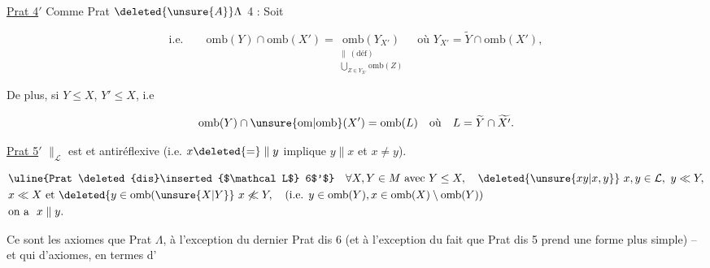 \uline{Prat  4$'$} Comme Prat $\deleted{\unsure{A}}\Lambda$ 4 :  Soit


\[
\text{i.e.}\qquad \mathrm{omb}(Y)\cap\mathrm{omb}(X')=
\underset{\substack{\parallel\,(\mathrm{déf})\\ \displaystyle\bigcup_{Z\in Y_{X'}}\mathrm{omb}(Z)}}{\mathrm{omb}(Y_{X'})}
\quad \text{où }Y_{X'}=\widetilde Y\cap\mathrm{omb}(X'),
\]

De plus, si $Y\leq X$,  $Y'\leq X$, i.e

\[
\mathrm{omb}(Y)\cap\unsure{\mathrm{om}|\mathrm{omb}}(X')=\mathrm{omb}(L)\quad \text{où}\quad L=\widetilde Y\cap\widetilde{X'}.
\]

\uline{Prat  5$'$} $\parallel_{\mathcal L}$ est  et antiréflexive (i.e. $x\deleted{=}\parallel y$ implique $y\parallel x$ et $x\ne y$).

\[
\begin{aligned}
&\text{\uline{Prat \deleted{dis}\inserted{$\mathcal L$} 6$'$}}\quad \forall X,Y\in M\ \text{avec }Y\leq X,\quad \deleted{\unsure{xy|x,y}}\ x,y\in\mathcal L,\ y\ll Y,\\
&x\ll X\ \text{et }\deleted{y\in\mathrm{omb}(\unsure{X|Y}}\ x\not\ll Y,\quad (\text{i.e. } y\in\mathrm{omb}(Y),x\in\mathrm{omb}(X)\setminus\mathrm{omb}(Y))\\
&\text{on a }\ x\parallel y.
\end{aligned}
\]


Ce sont les  axiomes que Prat $\Lambda$, à l'exception du dernier Prat dis 6 (et à l'exception du fait que Prat dis 5 prend une forme plus simple) -- et qui    d'axiomes,   en termes d'

